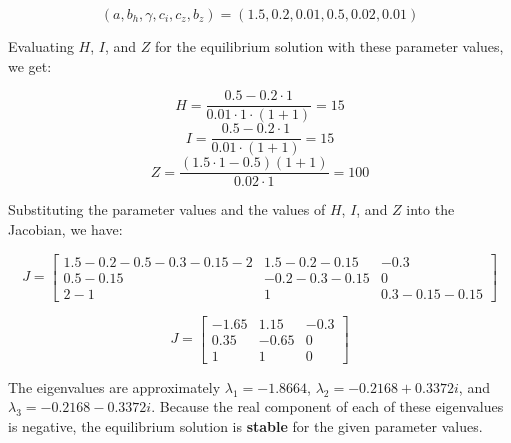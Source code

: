 \documentclass[
	12pt
]{article}
\begin{document}
\begin{equation}
(a,b_h,\gamma,c_i,c_z,b_z)=(1.5,0.2,0.01,0.5,0.02,0.01)
\end{equation}

Evaluating $H$, $I$, and $Z$ for the equilibrium solution with these parameter values, we get:

\begin{equation}
    H = \frac{0.5-0.2\cdot1}{0.01\cdot1\cdot(1+1)} = 15
\end{equation}
\begin{equation}
    I = \frac{0.5-0.2\cdot1}{0.01\cdot(1+1)} = 15
\end{equation}
\begin{equation}
    Z = \frac{(1.5\cdot1-0.5)(1+1)}{0.02\cdot1} = 100
\end{equation}

Substituting the parameter values and the values of $H$, $I$, and $Z$ into the Jacobian, we have:

$$
J=\begin{bmatrix} 1.5-0.2-0.5-0.3-0.15-2 & 1.5-0.2-0.15 & -0.3 \\ 0.5 - 0.15 & -0.2-0.3-0.15 & 0 \\ 2-1 & 1 & 0.3-0.15-0.15 \end{bmatrix}
$$

$$
J=\begin{bmatrix} -1.65 & 1.15 & -0.3 \\ 0.35 & -0.65 & 0 \\ 1 & 1 & 0 \end{bmatrix}
$$

The eigenvalues are approximately $\lambda_1=-1.8664$, $\lambda_2=-0.2168+0.3372i$, and $\lambda_3=-0.2168-0.3372i$. Because the real component of each of these eigenvalues is negative, the equilibrium solution is \textbf{stable} for the given parameter values.
\end{document}
